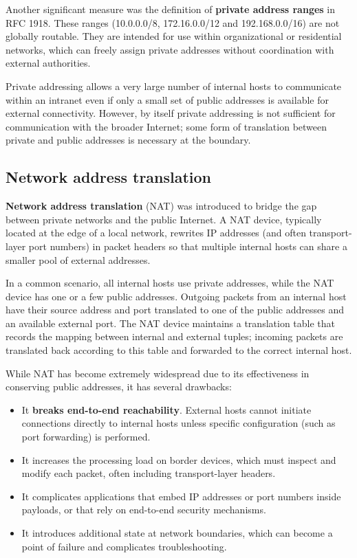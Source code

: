 Another significant measure was the definition of \textbf{private address ranges} in RFC 1918. These ranges (10.0.0.0/8, 172.16.0.0/12 and 192.168.0.0/16) are not globally routable. They are intended for use within organizational or residential networks, which can freely assign private addresses without coordination with external authorities.

Private addressing allows a very large number of internal hosts to communicate within an intranet even if only a small set of public addresses is available for external connectivity. However, by itself private addressing is not sufficient for communication with the broader Internet; some form of translation between private and public addresses is necessary at the boundary.

\subsection{Network address translation}

\textbf{Network address translation} (NAT) was introduced to bridge the gap between private networks and the public Internet. A NAT device, typically located at the edge of a local network, rewrites IP addresses (and often transport-layer port numbers) in packet headers so that multiple internal hosts can share a smaller pool of external addresses.

In a common scenario, all internal hosts use private addresses, while the NAT device has one or a few public addresses. Outgoing packets from an internal host have their source address and port translated to one of the public addresses and an available external port. The NAT device maintains a translation table that records the mapping between internal and external tuples; incoming packets are translated back according to this table and forwarded to the correct internal host.

While NAT has become extremely widespread due to its effectiveness in conserving public addresses, it has several drawbacks:

\begin{itemize}
\item It \textbf{breaks end-to-end reachability}. External hosts cannot initiate connections directly to internal hosts unless specific configuration (such as port forwarding) is performed.
\item It increases the processing load on border devices, which must inspect and modify each packet, often including transport-layer headers.
\item It complicates applications that embed IP addresses or port numbers inside payloads, or that rely on end-to-end security mechanisms.
\item It introduces additional state at network boundaries, which can become a point of failure and complicates troubleshooting.
\end{itemize}

